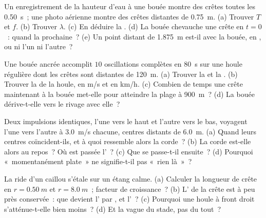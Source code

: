 \begin{exercise}[$\star\star\star$]\label{exo:g12:mechanical-waves:12}
Un enregistrement de la hauteur d'eau à une bouée montre des crêtes
toutes les \qty{0.50}{s}~; une photo aérienne montre des crêtes
distantes de \qty{0.75}{m}.
(a) Trouver $T$ et $f$. (b) Trouver $\lambda$. (c) En déduire la
. (d) La bouée chevauche une crête en $t = 0$~: quand la
prochaine~? (e) Un point distant de \qty{1.875}{m} est-il
 avec la bouée, en ,
ou ni l'un ni l'autre~?
\end{exercise}

\begin{exercise}[$\star\star\star$]\label{exo:g12:mechanical-waves:13}
Une bouée ancrée accomplit $10$ oscillations complètes en \qty{80}{s}
sur une houle régulière dont les crêtes sont distantes de \qty{120}{m}.
(a) Trouver la  et la .
(b) Trouver la  de la houle, en \unit{m/s} et en \unit{km/h}.
(c) Combien de temps une crête maintenant à la bouée met-elle pour
atteindre la plage à \qty{900}{m}~? (d) La bouée dérive-t-elle vers le
rivage avec elle~?
\end{exercise}

\begin{exercise}[$\star\star\star$]\label{exo:g12:mechanical-waves:14}
Deux impulsions identiques, l'une vers le haut et l'autre vers le bas,
voyagent l'une vers l'autre à \qty{3.0}{m/s} chacune, centres distants
de \qty{6.0}{m}. (a) Quand leurs centres coïncident-ils, et à quoi
ressemble alors la corde~? (b) La corde est-elle alors au repos~? Où
est passée l'~? (c) Que se passe-t-il ensuite~?
(d) Pourquoi «~momentanément plate~» ne signifie-t-il pas «~rien là~»~?
\end{exercise}

\begin{exercise}[$\star\star\star$]\label{exo:g12:mechanical-waves:15}
La ride d'un caillou s'étale sur un étang calme. (a) Calculer la
longueur de crête en $r = \qty{0.50}{m}$ et $r = \qty{8.0}{m}$~; facteur
de croissance~? (b) L' de la crête est à peu près conservée~:
que devient l' par , et l'~?
(c) Pourquoi une houle à front droit s'atténue-t-elle bien moins~?
(d) Et la vague du stade, pas du tout~?
\end{exercise}

